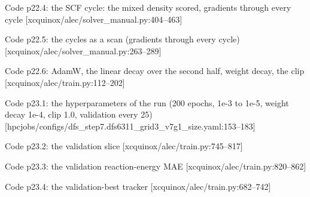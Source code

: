\begin{frame}[allowframebreaks]{Code p22.4: the SCF cycle: the mixed density scored, gradients through every cycle [xcquinox/alec/solver\_manual.py:404--463]}
\label{code:p22_4_the_scf_cycle_the_mixed_density_scored_g}
\end{frame}
\begin{frame}[allowframebreaks]{Code p22.5: the cycles as a scan (gradients through every cycle) [xcquinox/alec/solver\_manual.py:263--289]}
\label{code:p22_5_the_cycles_as_a_scan_gradients_through_e}
\end{frame}
\begin{frame}[allowframebreaks]{Code p22.6: AdamW, the linear decay over the second half, weight decay, the clip [xcquinox/alec/train.py:112--202]}
\label{code:p22_6_adamw_the_linear_decay_over_the_second_h}
\end{frame}
\begin{frame}[allowframebreaks]{Code p23.1: the hyperparameters of the run (200 epochs, 1e-3 to 1e-5, weight decay 1e-4, clip 1.0, validation every 25) [hpcjobs/configs/dfs\_step7.dfs6311\_grid3\_v7g1\_size.yaml:153--183]}
\label{code:p23_1_the_hyperparameters_of_the_run_200_epoch}
\end{frame}
\begin{frame}[allowframebreaks]{Code p23.2: the validation slice [xcquinox/alec/train.py:745--817]}
\label{code:p23_2_the_validation_slice}
\end{frame}
\begin{frame}[allowframebreaks]{Code p23.3: the validation reaction-energy MAE [xcquinox/alec/train.py:820--862]}
\label{code:p23_3_the_validation_reaction_energy_mae}
\end{frame}
\begin{frame}[allowframebreaks]{Code p23.4: the validation-best tracker [xcquinox/alec/train.py:682--742]}
\label{code:p23_4_the_validation_best_tracker}
\end{frame}
